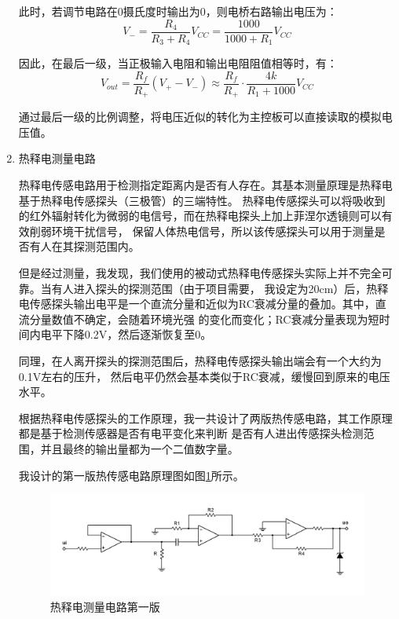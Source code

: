 \documentclass{article}
\begin{document}
\begin{spacing}{1.5}
\begin{enumerate}
        此时，若调节电路在0摄氏度时输出为0，则电桥右路输出电压为：
        \begin{equation}
            V_{-} = \frac{R_4}{R_3 + R_4} V_{CC} = \frac{1000}{1000 + R_1 } V_{CC}
        \end{equation}

        因此，在最后一级，当正极输入电阻和输出电阻阻值相等时，有：
        \begin{equation}
            V_{out} = \frac{R_f}{R_{+}} (V_{+} - V_{-}) \approx \frac{R_f}{R_{+}} \cdot \frac{4k}{R_1 + 1000} V_{CC}  
        \end{equation}

        通过最后一级的比例调整，将电压近似的转化为主控板可以直接读取的模拟电压值。

        \item 热释电测量电路
        
        热释电传感电路用于检测指定距离内是否有人存在。其基本测量原理是热释电基于热释电传感探头（三极管）的三端特性。
        热释电传感探头可以将吸收到的红外辐射转化为微弱的电信号，而在热释电探头上加上菲涅尔透镜则可以有效削弱环境干扰信号，
        保留人体热电信号，所以该传感探头可以用于测量是否有人在其探测范围内。

        但是经过测量，我发现，我们使用的被动式热释电传感探头实际上并不完全可靠。当有人进入探头的探测范围（由于项目需要，
        我设定为20cm）后，热释电传感探头输出电平是一个直流分量和近似为RC衰减分量的叠加。其中，直流分量数值不确定，会随着环境光强
        的变化而变化；RC衰减分量表现为短时间内电平下降0.2V，然后逐渐恢复至0。
        
        同理，在人离开探头的探测范围后，热释电传感探头输出端会有一个大约为0.1V左右的压升，
        然后电平仍然会基本类似于RC衰减，缓慢回到原来的电压水平。

        根据热释电传感探头的工作原理，我一共设计了两版热传感电路，其工作原理都是基于检测传感器是否有电平变化来判断
        是否有人进出传感探头检测范围，并且最终的输出量都为一个二值数字量。
        
        我设计的第一版热传感电路原理图如图\ref{fig:design_prin_4}所示。

        \begin{figure}[H]
            \centering
            \includegraphics[scale=0.4]{fig/design/principle4.png}
            \caption{热释电测量电路第一版}
            \label{fig:design_prin_4}
        \end{figure}


\end{enumerate}
\end{spacing}
\end{document}
